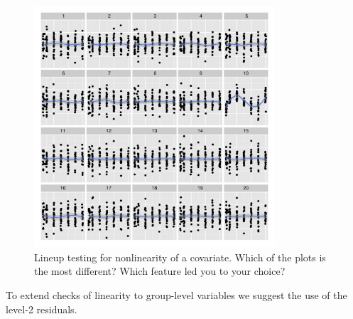 \documentclass[12pt]{article}
\newcommand{\alnote}[1]{\todo[inline,color=green!40]{#1}} %
\begin{document}
\begin{figure}
	\centering
	\includegraphics[width=0.8\textwidth]{dialyzernonlinear-10.pdf}
	\caption{\label{fig:linearity} Lineup testing  for nonlinearity of a covariate. Which of the plots is the most different? Which feature led you to your choice?}

\end{figure}

To extend checks of linearity to group-level variables we suggest the use of the level-2 residuals. 
\end{document}
